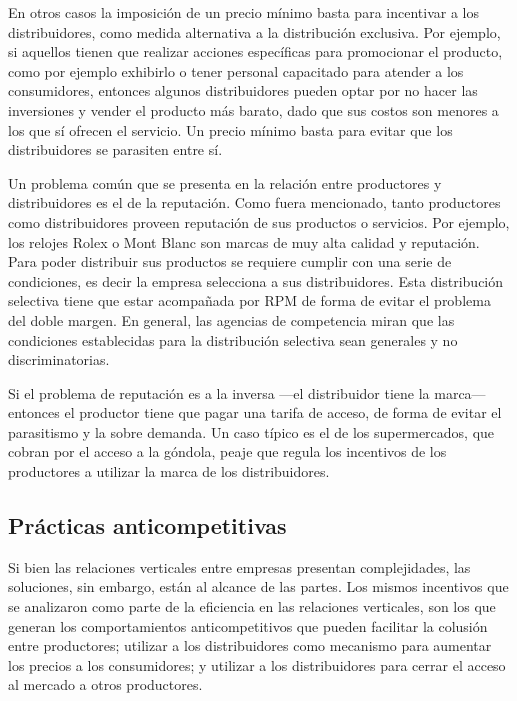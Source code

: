 \documentclass[
  12pt,
  spanish,
]{book}
\begin{document}
En otros casos la imposición de un precio mínimo basta para incentivar a los distribuidores, como medida alternativa a la distribución exclusiva. Por ejemplo, si aquellos tienen que realizar acciones específicas para promocionar el producto, como por ejemplo exhibirlo o tener personal capacitado para atender a los consumidores, entonces algunos distribuidores pueden optar por no hacer las inversiones y vender el producto más barato, dado que sus costos son menores a los que sí ofrecen el servicio. Un precio mínimo basta para evitar que los distribuidores se parasiten entre sí.

Un problema común que se presenta en la relación entre productores y distribuidores es el de la reputación. Como fuera mencionado, tanto productores como distribuidores proveen reputación de sus productos o servicios. Por ejemplo, los relojes Rolex o Mont Blanc son marcas de muy alta calidad y reputación. Para poder distribuir sus productos se requiere cumplir con una serie de condiciones, es decir la empresa selecciona a sus distribuidores. Esta distribución selectiva tiene que estar acompañada por RPM de forma de evitar el problema del doble margen. En general, las agencias de competencia miran que las condiciones establecidas para la distribución selectiva sean generales y no discriminatorias.

Si el problema de reputación es a la inversa ---el distribuidor tiene la marca--- entonces el productor tiene que pagar una tarifa de acceso, de forma de evitar el parasitismo y la sobre demanda. Un caso típico es el de los supermercados, que cobran por el acceso a la góndola, peaje que regula los incentivos de los productores a utilizar la marca de los distribuidores.

\hypertarget{pruxe1cticas-anticompetitivas}{%
\subsection{Prácticas anticompetitivas}\label{pruxe1cticas-anticompetitivas}}

Si bien las relaciones verticales entre empresas presentan complejidades, las soluciones, sin embargo, están al alcance de las partes. Los mismos incentivos que se analizaron como parte de la eficiencia en las relaciones verticales, son los que generan los comportamientos anticompetitivos que pueden facilitar la colusión entre productores; utilizar a los distribuidores como mecanismo para aumentar los precios a los consumidores; y utilizar a los distribuidores para cerrar el acceso al mercado a otros productores.
\end{document}
